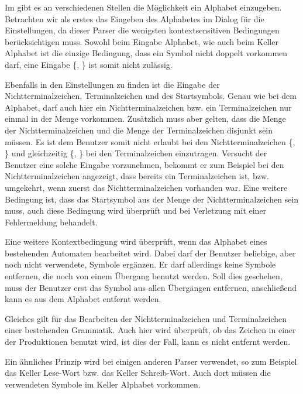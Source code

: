 Im \gtitool gibt es an verschiedenen Stellen die Möglichkeit ein Alphabet
einzugeben. Betrachten wir als erstes das Eingeben des Alphabetes im Dialog für
die Einstellungen, da dieser Parser die wenigsten kontextsensitiven Bedingungen
berücksichtigen muss. Sowohl beim Eingabe Alphabet, wie auch beim Keller
Alphabet ist die einzige Bedingung, dass ein Symbol nicht doppelt vorkommen
darf, eine Eingabe \{, \} ist somit nicht
zulässig.\vspace{10pt}

Ebenfalls in den Einstellungen zu finden ist die Eingabe der
Nichtterminalzeichen, Terminalzeichen und des Startsymbols. Genau wie bei dem
Alphabet, darf auch hier ein Nichtterminalzeichen bzw. ein Terminalzeichen nur
einmal in der Menge vorkommen. Zusätzlich muss aber gelten, dass die Menge der
Nichtterminalzeichen  und die Menge der Terminalzeichen disjunkt sein müssen. Es
ist dem Benutzer somit nicht erlaubt bei den Nichtterminalzeichen
\{, \} und gleichzeitig
\{, \} bei den Terminalzeichen einzutragen.
Versucht der Benutzer eine solche Eingabe vorzunehmen, bekommt er zum Beispiel
bei den Nichtterminalzeichen angezeigt, dass  bereits ein
Terminalzeichen ist, bzw. umgekehrt, wenn zuerst das Nichtterminalzeichen
vorhanden war. Eine weitere Bedingung ist, dass das Startsymbol aus der Menge der
Nichtterminalzeichen sein muss, auch diese Bedingung wird überprüft und bei
Verletzung mit einer Fehlermeldung behandelt.\vspace{10pt}

Eine weitere Kontextbedingung wird überprüft, wenn das Alphabet eines
bestehenden Automaten bearbeitet wird. Dabei darf der Benutzer beliebige, aber
noch nicht verwendete, Symbole ergänzen. Er darf allerdings keine Symbole
entfernen, die noch von einem Übergang benutzt werden. Soll dies geschehen,
muss der Benutzer erst das Symbol aus allen Übergängen entfernen,
anschließend kann es aus dem Alphabet entfernt werden.\vspace{10pt}

Gleiches gilt für das Bearbeiten der Nichtterminalzeichen und Terminalzeichen
einer bestehenden Grammatik. Auch hier wird überprüft, ob das Zeichen in einer
der Produktionen benutzt wird, ist dies der Fall, kann es nicht entfernt
werden.\vspace{10pt}

Ein ähnliches Prinzip wird bei einigen anderen Parser verwendet, so zum
Beispiel das Keller Lese-Wort bzw. das Keller Schreib-Wort. Auch dort müssen
die verwendeten Symbole im Keller Alphabet vorkommen.\vspace{10pt}


